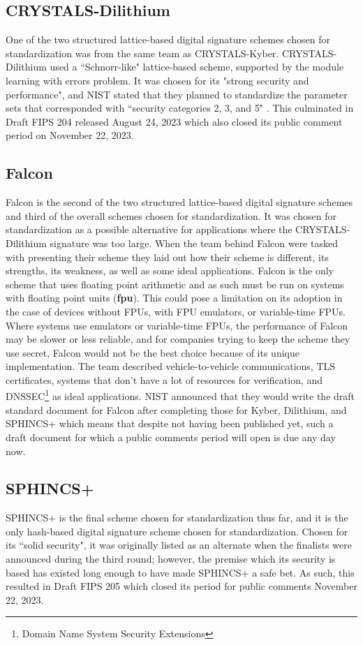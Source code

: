 \subsection{CRYSTALS-Dilithium}
One of the two structured lattice-based digital signature schemes chosen for standardization was from the same team as CRYSTALS-Kyber. CRYSTALS-Dilithium used a ``Schnorr-like" \cite{dilithium} lattice-based scheme, supported by the module learning with errors problem. It was chosen for its "strong security and performance", and NIST stated that they planned to standardize the parameter sets that corresponded with ``security categories 2, 3, and 5" \cite{moody_fourth}. This culminated in Draft FIPS 204 released August 24, 2023 which also closed its public comment period on November 22, 2023. 

\subsection{Falcon}
Falcon is the second of the two structured lattice-based digital signature schemes and third of the overall schemes chosen for standardization. It was chosen for standardization as a possible alternative for applications where the CRYSTALS-Dilithium signature was too large. When the team behind Falcon were tasked with presenting their scheme they laid out how their scheme is different, its strengths, its weakness, as well as some ideal applications. Falcon is the only scheme that uses floating point arithmetic and as such must be run on systems with floating point units (\textbf{\gls{fpu}}). This could pose a limitation on its adoption in the case of devices without FPUs, with FPU emulators, or variable-time FPUs. Where systems use emulators or variable-time FPUs, the performance of Falcon may be slower or less reliable, and for companies trying to keep the scheme they use secret, Falcon would not be the best choice because of its unique implementation. The team described vehicle-to-vehicle communications, TLS certificates, systems that don't have a lot of resources for verification, and DNSSEC\footnote{Domain Name System Security Extensions} as ideal applications. NIST announced that they would write the draft standard document for Falcon after completing those for Kyber, Dilithium, and SPHINCS+ which means that despite not having been published yet, such a draft document for which a public comments period will open is due any day now. 

\subsection{SPHINCS+}
SPHINCS+ is the final scheme chosen for standardization thus far, and it is the only hash-based digital signature scheme chosen for standardization. Chosen for its ``solid security", it was originally listed as an alternate when the finalists were announced during the third round; however, the premise which its security is based has existed long enough to have made SPHINCS+ a safe bet. As such, this resulted in Draft FIPS 205 which closed its period for public comments November 22, 2023.

